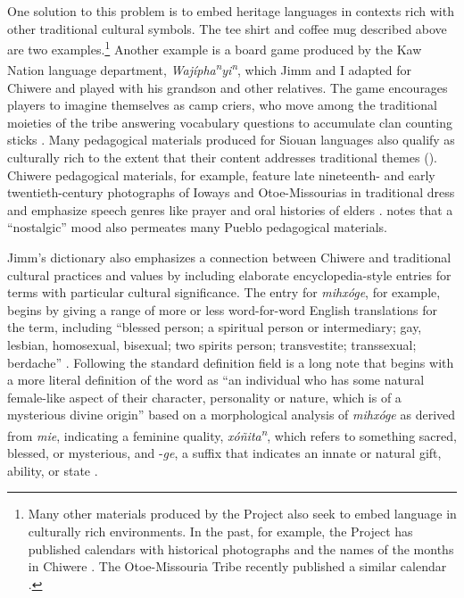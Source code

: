 \documentclass[output=paper]{LSP/langsci}
\begin{document}
One solution to this problem is to embed heritage languages in contexts rich with other traditional cultural symbols. The tee shirt and coffee mug described above are two examples.\footnote{Many other materials produced by the Project also seek to embed language in culturally rich environments. In the past, for example, the Project has published calendars with historical photographs and the names of the months in Chiwere \citep{Goodtracks1985}. The Otoe-Missouria Tribe recently published a similar calendar \citep{OtoeMissouriaLD2014}.}  Another example is a board game produced by the Kaw Nation language department, \emph{Waj\'ipha\textsuperscript{n}yi\textsuperscript{n}}, which Jimm and I adapted for Chiwere and played with his grandson and other relatives. The game encourages players to imagine themselves as camp criers, who move among the traditional moieties of the tribe answering vocabulary questions to accumulate clan counting sticks \citep{KanzaLP2004}. Many pedagogical materials produced for Siouan languages also qualify as culturally rich to the extent that their content addresses traditional themes (\citealt[e.g.][]{HartmannMarschke2010, KanzaLP2010}). Chiwere pedagogical materials, for example, feature late nineteenth- and early twentieth-century photographs of Ioways and Otoe-Missourias in traditional dress and emphasize speech genres like prayer and oral histories of elders \citep{OtoeIowaWistrandRobinson1977, OtoeIowaWistrandRobinson1978}.  notes that a ``nostalgic'' mood also permeates many Pueblo pedagogical materials.

Jimm's dictionary also emphasizes a connection between Chiwere and traditional cultural practices and values by including elaborate encyclopedia-style entries for terms with particular cultural significance. The entry for \emph{mihx\'oge}, for example, begins by giving a range of more or less word-for-word English translations for the term, including ``blessed person; a spiritual person or intermediary; gay, lesbian, homosexual, bisexual; two spirits person; transvestite; transsexual; berdache'' \citep[6]{Goodtracks2008}. Following the standard definition field is a long note that begins with a more literal definition of the word as ``an individual who has some natural female-like aspect of their character, personality or nature, which is of a mysterious divine origin'' based on a morphological analysis of \emph{mihx\'oge} as derived from \emph{mie}, indicating a feminine quality, \emph{x\'o\~nita\textsuperscript{n}}, which refers to something sacred, blessed, or mysterious, and -\emph{ge}, a suffix that indicates an innate or natural gift, ability, or state \citep[6]{Goodtracks2008}.
\end{document}
